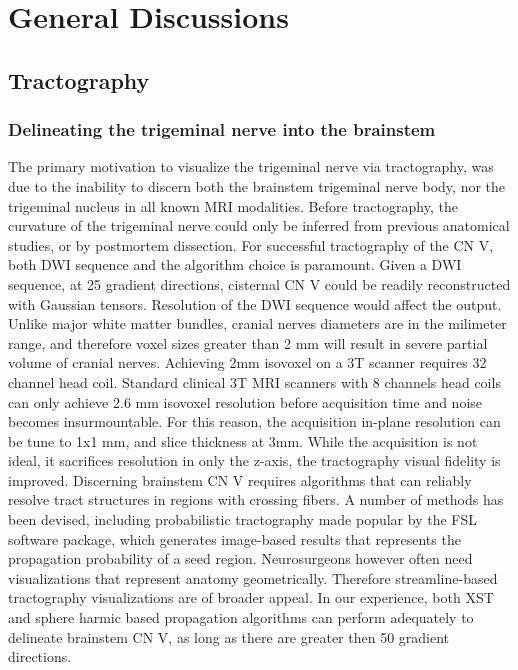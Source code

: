 \graphicspath{{images/discussions/}}

\chapter{General Discussions}
\section{Tractography}
\subsection{Delineating the trigeminal nerve into the brainstem}
The primary motivation to visualize the trigeminal nerve via tractography, was due to the inability to discern both the brainstem trigeminal nerve body, nor the trigeminal nucleus in all known MRI modalities. Before tractography, the curvature of the trigeminal nerve could only be inferred from previous anatomical studies, or by postmortem dissection. 
For successful tractography of the CN V, both DWI sequence and the algorithm choice is paramount. Given a DWI sequence, at 25 gradient directions, cisternal CN V could be readily reconstructed with Gaussian tensors. Resolution of the DWI sequence would affect the output. Unlike major white matter bundles, cranial nerves diameters are in the milimeter range, and therefore voxel sizes greater than 2 mm will result in severe partial volume of cranial nerves. Achieving 2mm isovoxel on a 3T scanner requires 32 channel head coil. Standard clinical 3T MRI scanners with 8 channels head coils can only achieve 2.6 mm isovoxel resolution before acquisition time and noise becomes insurmountable. For this reason, the acquisition in-plane resolution can be tune to 1x1 mm, and slice thickness at 3mm. While the acquisition is not ideal, it sacrifices resolution in only the z-axis, the tractography visual fidelity is improved. 
Discerning brainstem CN V requires algorithms that can reliably resolve tract structures in regions with crossing fibers. A number of methods has been devised, including probabilistic tractography made popular by the FSL software package, which generates image-based results that represents the propagation probability of a seed region. Neurosurgeons however often need visualizations that represent anatomy geometrically. Therefore streamline-based tractography visualizations are of broader appeal. In our experience, both XST and sphere harmic based propagation algorithms can perform adequately to delineate brainstem CN V, as long as there are greater then 50 gradient directions. 
